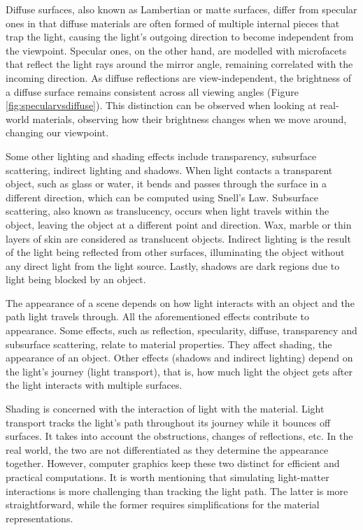 Diffuse surfaces, also known as Lambertian or matte surfaces, differ from specular ones in that diffuse materials are often formed of multiple internal pieces that trap the light, causing the light's outgoing direction to become independent from the viewpoint. Specular ones, on the other hand, are modelled with microfacets that reflect the light rays around the mirror angle, remaining correlated with the incoming direction. As diffuse reflections are view-independent, the brightness of a diffuse surface remains consistent across all viewing angles (Figure \ref{fig:specularvsdiffuse}). This distinction can be observed when looking at real-world materials, observing how their brightness changes when we move around, changing our viewpoint.


Some other lighting and shading effects include transparency, subsurface scattering, indirect lighting and shadows. When light contacts a transparent object, such as glass or water, it bends and passes through the surface in a different direction, which can be computed using Snell's Law. Subsurface scattering, also known as translucency, occurs when light travels within the object, leaving the object at a different point and direction. Wax, marble or thin layers of skin are considered as translucent objects. Indirect lighting is the result of the light being reflected from other surfaces, illuminating the object without any direct light from the light source. Lastly, shadows are dark regions due to light being blocked by an object. 

The appearance of a scene depends on how light interacts with an object and the path light travels through. All the aforementioned effects contribute to appearance. Some effects, such as reflection, specularity, diffuse, transparency and subsurface scattering, relate to material properties. They affect shading, the appearance of an object. Other effects (shadows and indirect lighting) depend on the light's journey (light transport), that is, how much light the object gets after the light interacts with multiple surfaces. 

Shading is concerned with the interaction of light with the material. Light transport tracks the light's path throughout its journey while it bounces off surfaces. It takes into account the obstructions, changes of reflections, etc. In the real world, the two are not differentiated as they determine the appearance together. However, computer graphics keep these two distinct for efficient and practical computations. It is worth mentioning that simulating light-matter interactions is more challenging than tracking the light path. The latter is more straightforward, while the former requires simplifications for the material representations.



